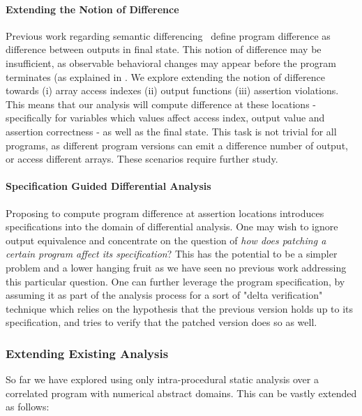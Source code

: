 \paragraph{Extending the Notion of Difference}
Previous work regarding semantic differencing~\cite{DwyerElbaumPerson08, GodlinStrichman09, EnglerRamos11, HawblitzelKawaguchiLahiriRebelo12} define program difference as difference between outputs in final state. This notion of difference may be insufficient, as observable behavioral changes may appear before the program terminates (as explained in . We explore extending the notion of difference towards (i) array access indexes (ii) output functions (iii) assertion violations. This means that our analysis will compute difference at these locations - specifically for variables which values affect access index, output value and assertion correctness - as well as the final state. This task is not trivial for all programs, as different program versions can emit a difference number of output, or access different arrays. These scenarios require further study.

\paragraph{Specification Guided Differential Analysis}
Proposing to compute program difference at assertion locations introduces specifications into the domain of differential analysis. One may wish to ignore output equivalence and concentrate on the question of \emph{how does patching a certain program affect its specification}? This has the potential to be a simpler problem and a lower hanging fruit as we have seen no previous work addressing this particular question. One can further leverage the program specification, by assuming it as part of the analysis process for a sort of "delta verification" technique which relies on the hypothesis that the previous version holds up to its specification, and tries to verify that the patched version does so as well.


\subsubsection{Extending Existing Analysis}

So far we have explored using only intra-procedural static analysis over a correlated program with numerical abstract domains. This can be vastly extended as follows:

